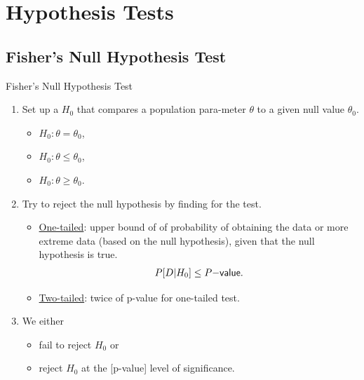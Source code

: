 \section{Hypothesis Tests}

\subsection{Fisher's Null Hypothesis Test}

\begin{frame}{Fisher's Null Hypothesis Test}

\begin{enumerate}
	\justifying
	\item Set up a  $H_0$ that compares a population para-meter $\theta$ to a given null value $\theta_0$.
	\begin{itemize}
		\item $H_0: \theta = \theta_0$,
		\item $H_0: \theta \leq \theta_0$,
		\item $H_0: \theta \geq \theta_0$.
	\end{itemize}
	\item Try to reject the null hypothesis by finding  for the test.\\
	\begin{itemize}
		\justifying
		\item \underline{One-tailed}: upper bound of of probability of obtaining the data or more extreme data (based on the null hypothesis), given that the null hypothesis is true.
		\begin{align*}
		P[D|H_0]\leq P\mathsf{-value}.
		\end{align*}
		\item \underline{Two-tailed}: twice of p-value for one-tailed test.
	\end{itemize}
	\item We either 
	\begin{itemize}
		\item fail to reject $H_0$ or
		\item reject $H_0$ at the [p-value] level of significance.
	\end{itemize}
\end{enumerate}

\end{frame}

